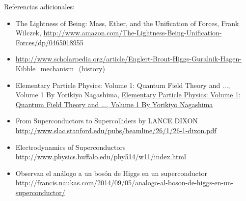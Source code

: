Referencias adicionales:
\begin{itemize}
\item The Lightness of Being: Mass, Ether, and the Unification of Forces,
Frank Wilczek, \url{http://www.amazon.com/The-Lightness-Being-Unification-Forces/dp/0465018955}
\item \url{http://www.scholarpedia.org/article/Englert-Brout-Higgs-Guralnik-Hagen-Kibble_mechanism_(history)}
\item Elementary Particle Physics: Volume 1: Quantum Field Theory and ..., Volume 1
 By Yorikiyo Nagashima, \url{Elementary Particle Physics: Volume 1: Quantum Field Theory and ..., Volume 1
 By Yorikiyo Nagashima}
\item From Superconductors 
to Supercolliders
by LANCE DIXON \url{http://www.slac.stanford.edu/pubs/beamline/26/1/26-1-dixon.pdf}
\item Electrodynamics of Superconductors \url{http://www.physics.buffalo.edu/phy514/w11/index.html}
\item Observan el análogo a un bosón de Higgs en un superconductor \url{http://francis.naukas.com/2014/09/05/analogo-al-boson-de-higgs-en-un-superconductor/}
\end{itemize}



